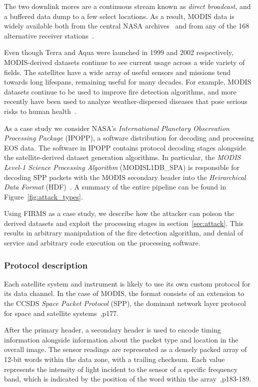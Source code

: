 The two downlink mores are a continuous stream known as \textit{direct broadcast}, and a buffered data dump to a few select locations.
As a result, MODIS data is widely available both from the central NASA archives~\cite{ladsweb} and from any of the 168 alternative receiver stations~\cite{nasaDirect}.

Even though Terra and Aqua were launched in 1999 and 2002 respectively, MODIS-derived datasets continue to see current usage across a wide variety of fields.
The satellites have a wide array of useful sensors and missions tend towards long lifespans, remaining useful for many decades.
For example, MODIS datasets continue to be used to improve fire detection algorithms, and more recently have been used to analyze weather-dispersed diseases that pose serious risks to human health~\cite{valleyFever}.

As a case study we consider NASA's \textit{International Planetary Observation Processing Package} (IPOPP), a software distribution for decoding and processing EOS data.
The software in IPOPP contains protocol decoding stages alongside the satellite-derived dataset generation algorithms.
In particular, the \textit{MODIS Level-1 Science Processing Algorithm} (MODISL1DB\_SPA) is responsible for decoding SPP packets with the MODIS secondary header into the \textit{Heirarchical Data Format} (HDF)~\cite{modisL1DB}.
A summary of the entire pipeline can be found in Figure~\ref{fig:attack_types}.

Using FIRMS as a case study, we describe how the attacker can poison the derived datasets and exploit the processing stages in section~\ref{sec:attack}.
This results in arbitrary manipulation of the fire detection algorithm, and denial of service and arbitrary code execution on the processing software.


\subsubsection{Protocol description}

Each satellite system and instrument is likely to use its own custom protocol for its data channel.
In the case of MODIS, the format consists of an extension to the CCSDS \textit{Space Packet Protocol} (SPP), the dominant network layer protocol for space and satellite systems~\cite{modisDescription},p177.

After the primary header, a secondary header is used to encode timing information alongside information about the packet type and location in the overall image.
The sensor readings are represented as a densely packed array of 12-bit words within the data zone, with a trailing checksum.
Each value represents the intensity of light incident to the sensor of a specific frequency band, which is indicated by the position of the word within the array~\cite{modisDescription},p183-189.

